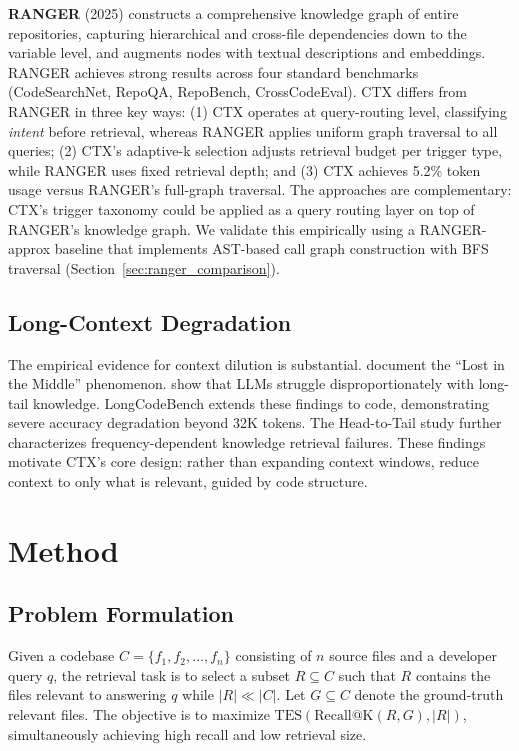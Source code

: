 \documentclass[11pt]{article}
\begin{document}
\textbf{RANGER} (2025) constructs a comprehensive knowledge graph of entire repositories, capturing hierarchical and cross-file dependencies down to the variable level, and augments nodes with textual descriptions and embeddings. RANGER achieves strong results across four standard benchmarks (CodeSearchNet, RepoQA, RepoBench, CrossCodeEval). CTX differs from RANGER in three key ways: (1) CTX operates at query-routing level, classifying \textit{intent} before retrieval, whereas RANGER applies uniform graph traversal to all queries; (2) CTX's adaptive-k selection adjusts retrieval budget per trigger type, while RANGER uses fixed retrieval depth; and (3) CTX achieves 5.2\% token usage versus RANGER's full-graph traversal. The approaches are complementary: CTX's trigger taxonomy could be applied as a query routing layer on top of RANGER's knowledge graph. We validate this empirically using a RANGER-approx baseline that implements AST-based call graph construction with BFS traversal (Section~\ref{sec:ranger_comparison}).

\subsection{Long-Context Degradation}

The empirical evidence for context dilution is substantial. \citet{shi2024distracted} document the ``Lost in the Middle'' phenomenon. \citet{kandpal2023longtail} show that LLMs struggle disproportionately with long-tail knowledge. LongCodeBench \citep{guo2025longcodebench} extends these findings to code, demonstrating severe accuracy degradation beyond 32K tokens. The Head-to-Tail study \citep{sun2024headtotail} further characterizes frequency-dependent knowledge retrieval failures. These findings motivate CTX's core design: rather than expanding context windows, reduce context to only what is relevant, guided by code structure.

\section{Method}

\subsection{Problem Formulation}

Given a codebase $C = \{f_1, f_2, \ldots, f_n\}$ consisting of $n$ source files and a developer query $q$, the retrieval task is to select a subset $R \subseteq C$ such that $R$ contains the files relevant to answering $q$ while $|R| \ll |C|$. Let $G \subseteq C$ denote the ground-truth relevant files. The objective is to maximize $\text{TES}(\text{Recall@K}(R, G), |R|)$, simultaneously achieving high recall and low retrieval size.
\end{document}

